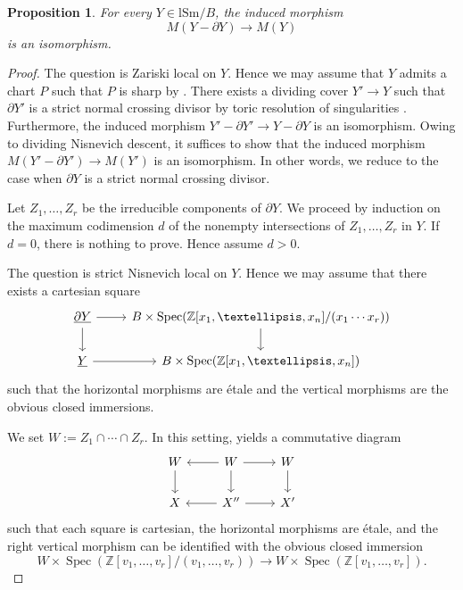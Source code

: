 \documentclass[10pt]{amsart}
\newtheorem{prop}[thm]{Proposition}
\theoremstyle{definition}
\theoremstyle{remark}
\numberwithin{equation}{subsection}
\newcommand{\Z}{\mathbb{Z}}
\DeclareMathOperator{\Spec}{Spec}
\newcommand{\ul}{\underline}
\newcommand{\lSm}{\mathrm{lSm}}
\begin{document}
\begin{prop}
\label{2.3}
For every $Y\in \lSm/B$, the induced morphism
\[
M(Y-\partial Y)
\to
M(Y)
\]
is an isomorphism.
\end{prop}
\begin{proof}
The question is Zariski local on $Y$.
Hence we may assume that $Y$ admits a chart $P$ such that $P$ is sharp by \cite[Proposition II.2.3.7]{Ogu}.
There exists a dividing cover $Y'\to Y$ such that $\partial Y'$ is a strict normal crossing divisor by toric resolution of singularities \cite[Theorem 11.1.9]{CLStoric}.
Furthermore, the induced morphism $Y'-\partial Y'\to Y-\partial Y$ is an isomorphism.
Owing to dividing Nisnevich descent, it suffices to show that the induced morphism $M(Y'-\partial Y')\to M(Y')$ is an isomorphism.
In other words, we reduce to the case when $\partial Y$ is a strict normal crossing divisor.

Let $Z_1,\ldots,Z_r$ be the irreducible components of $\partial Y$.
We proceed by induction on the maximum codimension $d$ of the nonempty intersections of $Z_1,\ldots,Z_r$ in $Y$.
If $d=0$, there is nothing to prove.
Hence assume $d>0$.

The question is strict Nisnevich local on $Y$.
Hence we may assume that there exists a cartesian square
\[
\begin{tikzcd}
\ul{\partial Y}\ar[d]\ar[r]&
B\times \Spec(\Z[x_1,\ldots,x_n]/(x_1\cdots x_r))\ar[d]
\\
\ul{Y}\ar[r]&
B\times \Spec(\Z[x_1,\ldots,x_n])
\end{tikzcd}
\]
such that the horizontal morphisms are \'etale and the vertical morphisms are the obvious closed immersions.

We set $W:=Z_1\cap \cdots\cap Z_r$.
In this setting, \cite[Construction 7.2.8]{logDM} yields a commutative diagram
\[
\begin{tikzcd}
W\ar[d]\ar[r,leftarrow]&
W\ar[d]\ar[r]&
W\ar[d]
\\
X\ar[r,leftarrow]&
X''\ar[r]&
X'
\end{tikzcd}
\]
such that each square is cartesian, the horizontal morphisms are \'etale, and the right vertical morphism can be identified with the obvious closed immersion
\[
W\times \Spec(\Z[v_1,\ldots,v_r]/(v_1,\ldots,v_r))
\to
W\times \Spec(\Z[v_1,\ldots,v_r]).
\]


\end{proof}
\end{document}

